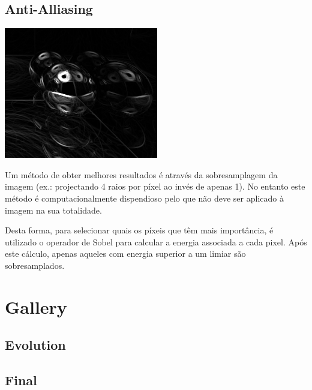 \documentclass[a4paper]{article}
\begin{document}
\subsection{Anti-Alliasing}
\begin{center}
	\includegraphics[scale=0.50]{images/sobel.png}
	\label{fig:sobel}
\end{center}

\indent Um método de obter melhores resultados é através da sobresamplagem da imagem (ex.: projectando
4 raios por píxel ao invés de apenas 1). No entanto este método é computacionalmente dispendioso pelo que não
deve ser aplicado à imagem na sua totalidade.

\indent Desta forma, para selecionar quais os píxeis que têm mais importância, é utilizado o operador de Sobel
para calcular a energia associada a cada pixel. Após este cálculo, apenas aqueles com energia superior a um limiar
são sobresamplados.

\cleardoublepage
\section{Gallery}
\subsection{Evolution}

\subsection{Final}
\end{document}
